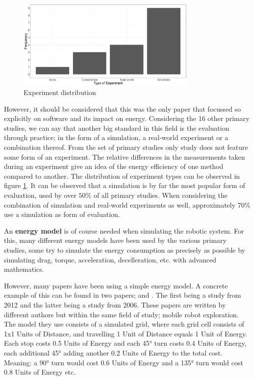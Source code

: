 \begin{figure}
    \includegraphics[width=250pt]{figures/experiment_distr.png}
    \caption{Experiment distribution}
    \label{fig:experiment_distr}
\end{figure}

However, it should be considered that this was the only paper that focussed so explicitly on software and its impact on energy.
Considering the 16 other primary studies, we can say that another big standard in this field is the evaluation through practice; 
in the form of a simulation, a real-world experiment or a combination thereof.
From the set of primary studies only study \cite{barili1995efficient_motion} does not feature some form of an experiment.
The relative differences in the measurements taken during an experiment give an idea of the energy efficiency of one method compared to another.
The distribution of experiment types can be observed in figure \ref{fig:experiment_distr}.
It can be observed that a simulation is by far the most popular form of evaluation, used by over $50\%$ of all primary studies.
When considering the combination of simulation and real-world experiments as well, approximately $70\%$ use a simulation as form of evaluation.

An \textbf{energy model} is of course needed when simulating the robotic system. 
For this, many different energy models have been used by the various primary studies, some try to simulate the energy consumption 
as precisely as possible by simulating drag, torque, acceleration, decelleration, etc. with advanced mathematics.

However, many papers have been using a simple energy model.
A concrete example of this can be found in two papers; \cite{patel2012exploration_strategy} and \cite{mei2006mobile_exploration}. 
The first being a study from 2012 and the latter being a study from 2006. 
These papers are written by different authors but within the same field of study; mobile robot exploration.
The model they use consists of a simulated grid, where each grid cell consists of 1x1 Units of Distance, 
and travelling 1 Unit of Distance equals 1 Unit of Energy.
Each stop costs 0.5 Units of Energy and each 45° turn costs 0.4 Units of Energy, each additional 45° adding another 
0.2 Units of Energy to the total cost.
Meaning: a 90° turn would cost 0.6 Units of Energy and a 135° turn would cost 0.8 Units of Energy etc.

